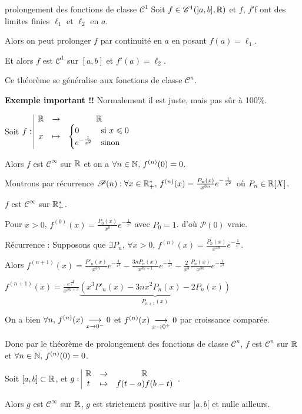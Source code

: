 \documentclass{prepacours}
\begin{document}
\begin{theoreme}{prolongement des fonctions de classe $\mathscr C^1$}{}
    Soit $f \in \mathscr C^1(]a, b], \mathbb{R})$ et $f$, $f'$f ont des limites finies 
    $\ell_1$ et $\ell_2$ en $a$. 

    Alors on peut prolonger $f$ par continuité en $a$ en posant $f(a) = \ell_1$.

    Et alors $f$ est $\mathscr C^1$ sur $[a, b]$ et $f'(a) = \ell_2$.
\end{theoreme}

\begin{remarque}
    Ce théorème se généralise aux fonctions de classe $\mathscr C^n$.
\end{remarque}

\begin{exemple}
    \textbf{Exemple important !!}
    Normalement il est juste, mais pas sûr à 100\%.

    Soit $f: \space \begin{array}{|ccc} \mathbb{R} & \to & \mathbb{R} \\ x & \mapsto & \begin{cases}
        0 & \text{si } x \leqslant 0\\
        e^{-\frac{1}{x^2}} & \text{sinon}
    \end{cases} \end{array}$

    Alors $f$ est $\mathscr C^\infty$ sur $\mathbb{R}$ et on a $\forall n \in \mathbb{N}, \, f^{(n)}(0) = 0$.

    Montrons par récurrence $\mathscr P(n) : \forall x \in \mathbb{R}_+^*, \, f^{(n)}(x) = \frac{P_n(x) }{x^{3n}} e^{-\frac{1}{x^2}}$ où $P_n \in \mathbb{R} [X]$. 

    $f$ est $\mathscr C^\infty$ sur $\mathbb{R}_+^*$. 

    Pour $x > 0$, $f^{(0)}(x) = \frac{P_0(x )}{x^0} e^{-\frac{1}{x^2}}$ avec $P_0 = 1$.
    d'où $\mathscr P(0)$ vraie.

    Récurrence : Supposons que $\exists P_n, \, \forall x > 0, \, f^{(n)}(x) = \frac{P_n(x)}{x^{3n}} e^{-\frac{1}{x^2}}$.

    Alors $f^{(n+1)}(x) = \frac{P'_n(x)}{x^{3n}} e^{-\frac{1}{x^2}}  - \frac{3n P_n(x)}{x^{3n + 1}}e^{-\frac{1}{x^2}} - \frac 2 {x^3} \frac{P_n(x)}{x^{3n}}e^{-\frac{1}{x^2}}$

    $f^{(n+1)}(x) = \frac{e^{\frac{-1}{x^2}}}{x^{3n + 3}} \underbrace{\left( x^3 P'_n(x) - 3nx^2 P_n(x) - 2P_n(x) \right)}_{P_{n+1}(x)}$

    On a bien $\forall n, \, f^{(n)}(x) \underset{x \to 0^-}{\longrightarrow} 0 $ et $f^{(n)}(x) \underset{x \to 0^+}{\longrightarrow} 0$ par croissance comparée. 

    Donc par le théorème de prolongement des fonctions de classe $\mathscr C^n$, $f$ est $\mathscr C^n$ sur $\mathbb{R}$ et $\forall n \in \mathbb{N}, \, f^{(n)}(0) = 0$.


    Soit $[a, b] \subset \mathbb{R}$, et $g: \space \begin{array}{|ccc} \mathbb{R} & \to & \mathbb{R} \\ t & \mapsto & f(t-a)f(b-t) \end{array}$.

    Alors $g$ est $\mathscr C^\infty$ sur $\mathbb{R}$, $g$ est strictement positive sur $]a, b[$ et nulle ailleurs.

\end{exemple}
\end{document}
